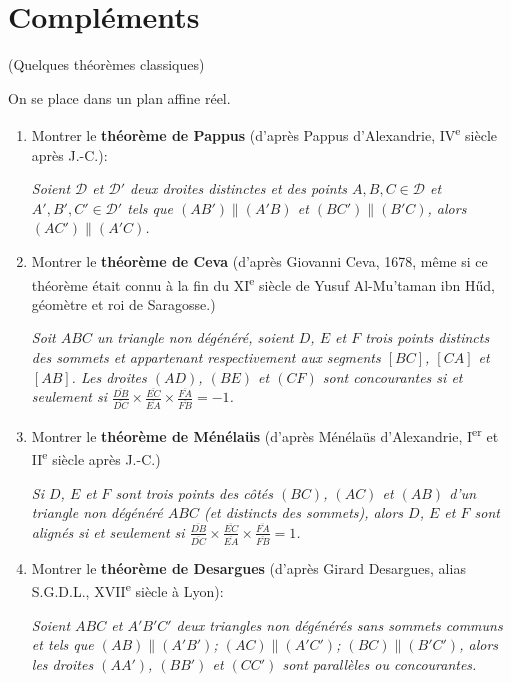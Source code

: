 \documentclass[a4paper,12pt,reqno]{amsart}
\begin{document}
\section{Compléments}

\begin{exo} (Quelques théorèmes classiques)

  On se place dans un plan affine réel.

  \begin{enumerate}
  \item Montrer le \textbf{théorème de Pappus} (d'après Pappus d'Alexandrie, IV\textsuperscript{e} siècle après J.-C.):

  \textit{\og Soient $\mathcal{D}$ et $\mathcal{D}'$ deux droites distinctes et des points $A,B,C\in \mathcal{D}$ et $A',B',C'\in \mathcal{D}'$
  tels que $(AB')\parallel(A'B)$ et $(BC')\parallel(B'C)$, alors $(AC')\parallel(A'C)$.\fg}

  \item Montrer le \textbf{théorème de Ceva} (d'après Giovanni Ceva, 1678, même si ce théorème était connu à la fin du XI\textsuperscript{e} siècle de Yusuf Al-Mu'taman ibn Hűd, géomètre et roi de Saragosse.)

  \textit{\og Soit $ABC$ un triangle non dégénéré, soient $D$, $E$ et $F$ trois points distincts des sommets et appartenant respectivement aux segments $[BC]$, $[CA]$ et $[AB]$. Les droites $(AD)$, $(BE)$ et $(CF)$ sont concourantes si et seulement si $\frac{\overline{DB}}{\overline{DC}}\times\frac{\overline{EC}}{\overline{EA}}\times\frac{\overline{FA}}{\overline{FB}}=-1$.\fg}

  \item Montrer le \textbf{théorème de Ménélaüs} (d'après Ménélaüs d'Alexandrie, I\textsuperscript{er} et II\textsuperscript{e} siècle après J.-C.)

  \textit{\og Si $D$, $E$ et $F$ sont trois points des côtés $(BC)$, $(AC)$ et $(AB)$ d'un triangle non dégénéré $ABC$ (et distincts des sommets), alors $D$, $E$ et $F$ sont alignés si et seulement si $\frac{\overline{DB}}{\overline{DC}}\times\frac{\overline{EC}}{\overline{EA}}\times\frac{\overline{FA}}{\overline{FB}}=1$.\fg}

  \item Montrer le \textbf{théorème de Desargues} (d'après Girard Desargues, alias S.G.D.L., XVII\textsuperscript{e} siècle à Lyon):

  \textit{\og Soient $ABC$ et $A'B'C'$ deux triangles non dégénérés sans sommets communs et tels que $(AB)\parallel(A'B')$; $(AC)\parallel(A'C')$; $(BC)\parallel(B'C')$, alors les droites $(AA')$, $(BB')$ et $(CC')$ sont parallèles ou concourantes.\fg}

  \end{enumerate}
\end{exo}
\end{document}
